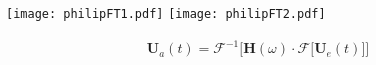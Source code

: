 \begin{frame}
\end{frame}

\begin{frame}
\begin{center}
    {\texttt{[image: philipFT1.pdf]}}
    {\texttt{[image: philipFT2.pdf]}}
\end{center}
\begin{align*}
        \mathbf{U}_a(t) = \mathcal{F}^{-1} \Big[\mathbf{H}(\omega) \cdot \mathcal{F} \big[\mathbf{U}_e(t)\big] \Big]
    \end{align*}
\end{frame}

